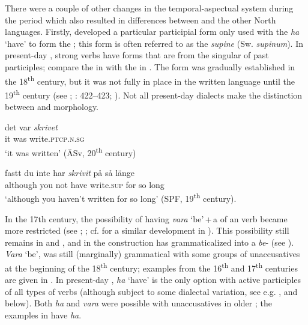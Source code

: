 \documentclass[output=paper]{langscibook}
\begin{document}
There were a couple of other changes in the temporal-aspectual system during the  period which also resulted in differences between  and the other North  languages. Firstly,  developed a particular participial form only used with the  \textit{ha} ‘have’ to form the  ; this form is often referred to as the \textit{supine} (Sw. \textit{supinum}). In present-day , strong verbs have  forms that are  from the  singular of past participles; compare the  in  with the  in . The  form was gradually established in the 18\textsuperscript{th} century, but it was not fully in place in the written language until the 19\textsuperscript{th} century (see \citealt{Platzack1981}; \citealt{Larsson2009}: 422–423; \citealt{Backstrom2019}). Not all present-day dialects make the distinction between  and  morphology.


\ea\label{ex:intro:7}
\ea\label{ex:intro:7a}
\gll  det    var \textit{skrivet} \\
it   was write.\textsc{ptcp.n.sg}\\
\glt    ‘it was written’ (ÄSv, 20\textsuperscript{th} century)


\ex\label{ex:intro:7b}
\gll  fastt       du   inte   har \textit{skrivit}  på   så   länge\\
      although   you   not   have   write.\textsc{sup}   for   so long\\
\glt    ‘although you haven’t written for so long’ (SPF, 19\textsuperscript{th} century).
\z
\z


In the 17th century, the possibility of having \textit{vara} ‘be’\,+\,a  of an  verb became more restricted (see \citealt{Johannisson1945}; \citealt{Larsson2009,Larsson2015}; cf. \citealt{McFaddenAlexiadou2005} for a similar development in ). This possibility still remains in  and , and in  the construction has grammaticalized into a \textit{be}{}- (see \citealt{Larsson2021Emergence}). \textit{Vara} ‘be’, was still (marginally) grammatical with some groups of unaccusatives at the beginning of the 18\textsuperscript{th} century; examples from the 16\textsuperscript{th} and 17\textsuperscript{th} centuries are given in . In present-day , \textit{ha} ‘have’ is the only option with active participles of all types of verbs (although subject to some dialectal variation, see e.g. \citealt{Larsson2014HAVE}, and  below). Both \textit{ha} and \textit{vara} were possible with unaccusatives in older ; the examples in  have \textit{ha}.
\end{document}
